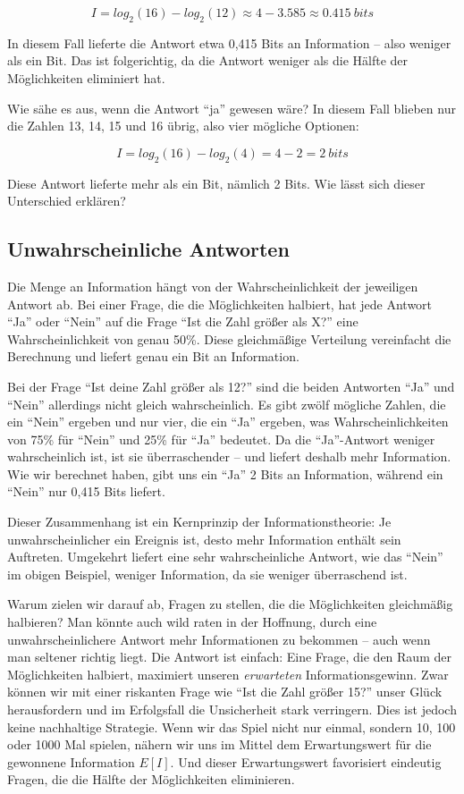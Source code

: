 \documentclass[
  letterpaper,
  DIV=11]{scrreprt}
\begin{document}
\[
I = log_2(16) - log_2(12) \approx 4 - 3.585 \approx 0.415~bits
\]

In diesem Fall lieferte die Antwort etwa 0,415 Bits an Information --
also weniger als ein Bit. Das ist folgerichtig, da die Antwort weniger
als die Hälfte der Möglichkeiten eliminiert hat.

Wie sähe es aus, wenn die Antwort ``ja'' gewesen wäre? In diesem Fall
blieben nur die Zahlen 13, 14, 15 und 16 übrig, also vier mögliche
Optionen:

\[
I = log_2(16) - log_2(4) = 4-2= 2~bits
\]

Diese Antwort lieferte mehr als ein Bit, nämlich 2 Bits. Wie lässt sich
dieser Unterschied erklären?

\subsection{Unwahrscheinliche
Antworten}\label{unwahrscheinliche-antworten}

Die Menge an Information hängt von der Wahrscheinlichkeit der jeweiligen
Antwort ab. Bei einer Frage, die die Möglichkeiten halbiert, hat jede
Antwort ``Ja'' oder ``Nein'' auf die Frage ``Ist die Zahl größer als
X?'' eine Wahrscheinlichkeit von genau 50\%. Diese gleichmäßige
Verteilung vereinfacht die Berechnung und liefert genau ein Bit an
Information.

Bei der Frage ``Ist deine Zahl größer als 12?'' sind die beiden
Antworten ``Ja'' und ``Nein'' allerdings nicht gleich wahrscheinlich. Es
gibt zwölf mögliche Zahlen, die ein ``Nein'' ergeben und nur vier, die
ein ``Ja'' ergeben, was Wahrscheinlichkeiten von 75\% für ``Nein'' und
25\% für ``Ja'' bedeutet. Da die ``Ja''-Antwort weniger wahrscheinlich
ist, ist sie überraschender -- und liefert deshalb mehr Information. Wie
wir berechnet haben, gibt uns ein ``Ja'' 2 Bits an Information, während
ein ``Nein'' nur 0,415 Bits liefert.

Dieser Zusammenhang ist ein Kernprinzip der Informationstheorie: Je
unwahrscheinlicher ein Ereignis ist, desto mehr Information enthält sein
Auftreten. Umgekehrt liefert eine sehr wahrscheinliche Antwort, wie das
``Nein'' im obigen Beispiel, weniger Information, da sie weniger
überraschend ist.

Warum zielen wir darauf ab, Fragen zu stellen, die die Möglichkeiten
gleichmäßig halbieren? Man könnte auch wild raten in der Hoffnung, durch
eine unwahrscheinlichere Antwort mehr Informationen zu bekommen -- auch
wenn man seltener richtig liegt. Die Antwort ist einfach: Eine Frage,
die den Raum der Möglichkeiten halbiert, maximiert unseren
\emph{erwarteten} Informationsgewinn. Zwar können wir mit einer
riskanten Frage wie ``Ist die Zahl größer 15?'' unser Glück
herausfordern und im Erfolgsfall die Unsicherheit stark verringern. Dies
ist jedoch keine nachhaltige Strategie. Wenn wir das Spiel nicht nur
einmal, sondern 10, 100 oder 1000 Mal spielen, nähern wir uns im Mittel
dem Erwartungswert für die gewonnene Information \(E[I]\). Und dieser
Erwartungswert favorisiert eindeutig Fragen, die die Hälfte der
Möglichkeiten eliminieren.
\end{document}
